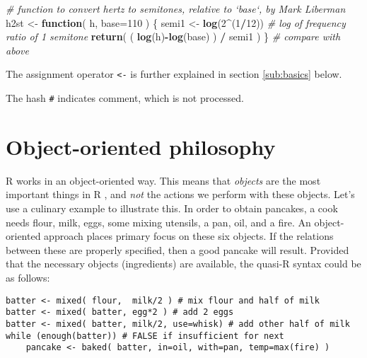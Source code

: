 \documentclass[]{book}
\newenvironment{Shaded}{\begin{snugshade}}{\end{snugshade}}
\newcommand{\CommentTok}[1]{\textcolor[rgb]{0.56,0.35,0.01}{\textit{#1}}}
\newcommand{\ControlFlowTok}[1]{\textcolor[rgb]{0.13,0.29,0.53}{\textbf{#1}}}
\newcommand{\DataTypeTok}[1]{\textcolor[rgb]{0.13,0.29,0.53}{#1}}
\newcommand{\DecValTok}[1]{\textcolor[rgb]{0.00,0.00,0.81}{#1}}
\newcommand{\KeywordTok}[1]{\textcolor[rgb]{0.13,0.29,0.53}{\textbf{#1}}}
\newcommand{\NormalTok}[1]{#1}
\newcommand{\OperatorTok}[1]{\textcolor[rgb]{0.81,0.36,0.00}{\textbf{#1}}}
\newcommand{\StringTok}[1]{\textcolor[rgb]{0.31,0.60,0.02}{#1}}
\begin{document}
\begin{Shaded}
\begin{Highlighting}[]
\CommentTok{# function to convert hertz to semitones, relative to `base`, by Mark Liberman}
\NormalTok{h2st <-}\StringTok{ }\ControlFlowTok{function}\NormalTok{( h, }\DataTypeTok{base=}\DecValTok{110}\NormalTok{ ) \{ }
\NormalTok{  semi1 <-}\StringTok{ }\KeywordTok{log}\NormalTok{(}\DecValTok{2}\OperatorTok{^}\NormalTok{(}\DecValTok{1}\OperatorTok{/}\DecValTok{12}\NormalTok{)) }\CommentTok{# log of frequency ratio of 1 semitone}
  \KeywordTok{return}\NormalTok{( ( }\KeywordTok{log}\NormalTok{(h)}\OperatorTok{-}\KeywordTok{log}\NormalTok{(base) ) }\OperatorTok{/}\StringTok{ }\NormalTok{semi1 ) \} }\CommentTok{# compare with above}
\end{Highlighting}
\end{Shaded}

The assignment operator \texttt{\textless{}-}
is further explained in section \ref{sub:basics} below.

The hash \texttt{\#} indicates comment, which is not processed.

\hypertarget{sec:objectorientedphilosophy}{%
\section{Object-oriented philosophy}\label{sec:objectorientedphilosophy}}

R works in an object-oriented way. This means that
\emph{objects} are the most important things in R , and \emph{not}
the actions we perform with these objects. Let's use a culinary example
to illustrate this. In order to obtain pancakes, a cook needs flour,
milk, eggs, some mixing utensils, a pan, oil, and a fire. An
object-oriented approach places primary focus on these six objects. If
the relations between these are properly specified, then a good pancake
will result. Provided that the necessary objects (ingredients) are
available, the quasi-R syntax could be as follows:

\begin{verbatim}
batter <- mixed( flour,  milk/2 ) # mix flour and half of milk
batter <- mixed( batter, egg*2 ) # add 2 eggs
batter <- mixed( batter, milk/2, use=whisk) # add other half of milk
while (enough(batter)) # FALSE if insufficient for next
    pancake <- baked( batter, in=oil, with=pan, temp=max(fire) )
\end{verbatim}
\end{document}

